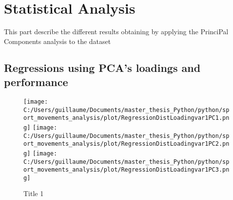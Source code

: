 \documentclass{article}%
\begin{document}
%
\normalsize%
\section{Statistical Analysis}%
This part describe the different results obtaining by                  applying the PrinciPal Components analysis to the dataset

%
\subsection{Regressions using PCA's loadings and performance }%


\begin{figure}[h!]%
\centering%
\texttt{[image: C:/Users/guillaume/Documents/master\_thesis\_Python/python/sport\_movements\_analysis/plot/RegressionDistLoadingvar1PC1.png]}%
\centering%
\texttt{[image: C:/Users/guillaume/Documents/master\_thesis\_Python/python/sport\_movements\_analysis/plot/RegressionDistLoadingvar1PC2.png]}%
\centering%
\texttt{[image: C:/Users/guillaume/Documents/master\_thesis\_Python/python/sport\_movements\_analysis/plot/RegressionDistLoadingvar1PC3.png]}%
\caption{Title 1}%
\end{figure}

%
\end{document}
